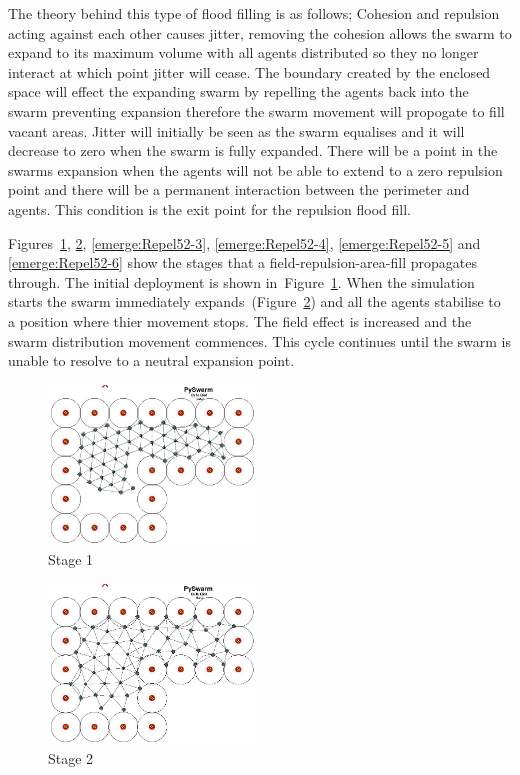 \documentclass[10pt,journal,letterpaper,twoside]{IEEEtran}
\begin{document}
The theory behind this type of flood filling is as follows; Cohesion and repulsion acting against each other causes jitter, removing the cohesion allows the swarm to expand to its maximum volume with all agents distributed so they no longer interact at which point jitter will cease. The boundary created by the enclosed space will effect the expanding swarm by repelling the agents back into the swarm preventing expansion therefore the swarm movement will propogate to fill vacant areas. Jitter will initially be seen as the swarm equalises and it will decrease to zero when the swarm is fully expanded. There will be a point in the swarms expansion when the agents will not be able to extend to a zero repulsion point and there will be a permanent interaction between the perimeter and agents. This condition is the exit point for the repulsion flood fill.

Figures~\ref{emerge:Repel52-1}, \ref{emerge:Repel52-2}, \ref{emerge:Repel52-3}, \ref{emerge:Repel52-4}, \ref{emerge:Repel52-5} and \ref{emerge:Repel52-6} show the stages that a field-repulsion-area-fill propagates through. The initial deployment is shown in~Figure~\ref{emerge:Repel52-1}. When the simulation starts the swarm immediately expands~(Figure~\ref{emerge:Repel52-2}) and all the agents stabilise to a position where thier movement stops. The field effect is increased and the swarm distribution movement commences. This cycle continues until the swarm is unable to resolve to a neutral expansion point.

\begin{figure}
\begin{center}
\includegraphics[width=5.5cm]{figures/REPEL52-1}
\end{center}
\caption{Stage 1\label{emerge:Repel52-1}}
\end{figure}

\begin{figure}
\begin{center}
\includegraphics[width=5.5cm]{figures/REPEL52-2}
\end{center}
\caption{Stage 2\label{emerge:Repel52-2}}
\end{figure}
\end{document}
